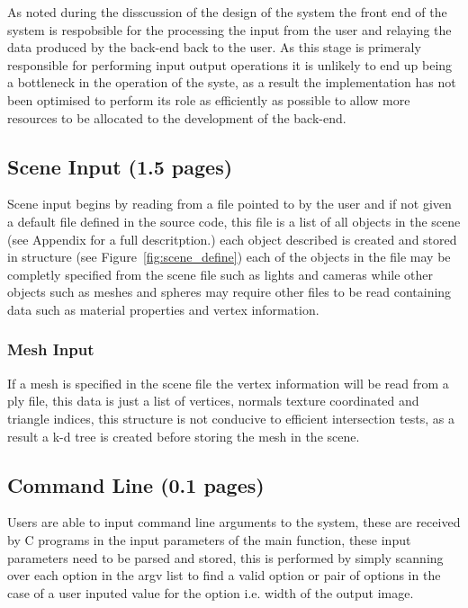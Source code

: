 As noted during the disscussion of the design of the system the front end of the system is respobsible for the processing
the input from the user and relaying the data produced by the back-end back to the user. As this stage is primeraly responsible
for performing input output operations it is unlikely to end up being a bottleneck in the operation of the syste, as a
result the implementation has not been optimised to perform its role as efficiently as possible to allow more resources
to be allocated to the development of the back-end.

\subsection{Scene Input (1.5 pages)}
Scene input begins by reading from a file pointed to by the user and if not given a default file defined in the source
code, this file is a list of all objects in the scene (see Appendix  for a full descritption.) each
object described is created and stored in structure (see Figure~\ref{fig:scene_define}) each of the objects in the
file may be completly specified from the scene file such as lights and cameras while other objects such as meshes
and spheres may require other files to be read containing data such as material properties and vertex information.

\subsubsection{Mesh Input}
If a mesh is specified in the scene file the vertex information will be read from a ply file, this data is just a list
of vertices, normals texture coordinated and triangle indices, this structure is not conducive to efficient intersection
tests, as a result a k-d tree is created before storing the mesh in the scene. 

\subsection{Command Line (0.1 pages)}
Users are able to input command line arguments to the system, these are received by C programs in the input parameters of
the main function, these input parameters need to be parsed and stored, this is performed by simply scanning over each
option in the argv list to find a valid option or pair of options in the case of a user inputed value for the option
i.e. width of the output image.

